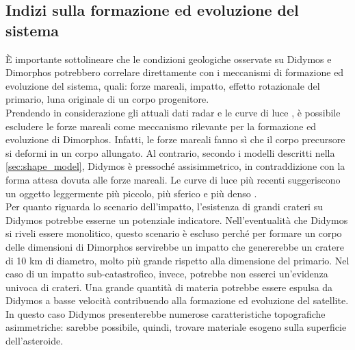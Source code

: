 \documentclass[a4paper,11pt,openright]{book}
\begin{document}
\subsection{Indizi sulla formazione ed evoluzione del sistema}
È importante sottolineare che le condizioni geologiche osservate su Didymos e Dimorphos potrebbero correlare direttamente con i meccanismi di formazione ed evoluzione del sistema, quali: forze mareali, impatto, effetto rotazionale del primario, luna originale di un corpo progenitore.\\
Prendendo in considerazione gli attuali dati radar \citep{naidu_radar_2020} e le curve di luce \citep{pravec_binary_2016}, è possibile escludere le forze mareali come meccanismo rilevante per la formazione ed evoluzione di Dimorphos. Infatti, le forze mareali fanno sì che il corpo precursore si deformi in un corpo allungato. Al contrario, secondo i modelli descritti nella \cref{sec:shape_model}, Didymos è pressoché assisimmetrico, in contraddizione con la forma attesa dovuta alle forze mareali. Le curve di luce più recenti suggeriscono un oggetto leggermente più piccolo, più sferico e più denso \citep{pravec_photometric_2022}.\\
Per quanto riguarda lo scenario dell'impatto, l'esistenza di grandi crateri su Didymos potrebbe esserne un potenziale indicatore. Nell'eventualità che Didymos si riveli essere monolitico, questo scenario è escluso perché per formare un corpo delle dimensioni di Dimorphos servirebbe un impatto che genererebbe un cratere di 10 km di diametro, molto più grande rispetto alla dimensione del primario. Nel caso di un impatto sub-catastrofico, invece, potrebbe non esserci un'evidenza univoca di crateri. Una grande quantità di materia potrebbe essere espulsa da Didymos a basse velocità contribuendo alla formazione ed evoluzione del satellite. In questo caso Didymos presenterebbe numerose caratteristiche topografiche asimmetriche: sarebbe possibile, quindi, trovare materiale esogeno sulla superficie dell'asteroide.
\end{document}
